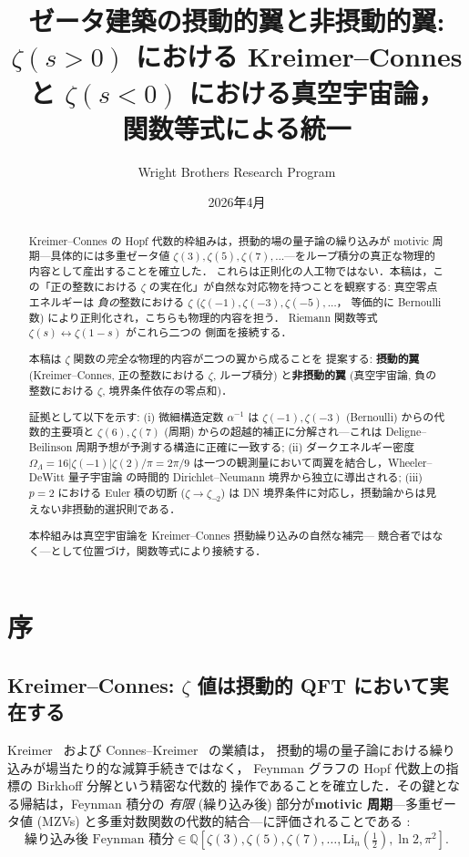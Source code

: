 \documentclass[11pt,a4paper]{article}
\title{ゼータ建築の摂動的翼と非摂動的翼:\\
$\zeta(s>0)$ における Kreimer--Connes と $\zeta(s<0)$ における真空宇宙論，\\
関数等式による統一}
\author{Wright Brothers Research Program}
\date{2026年4月}
\begin{document}
\maketitle

\begin{abstract}
Kreimer--Connes の Hopf 代数的枠組みは，摂動的場の量子論の繰り込みが
motivic 周期---具体的には多重ゼータ値 $\zeta(3), \zeta(5), \zeta(7),
\ldots$---をループ積分の真正な物理的内容として産出することを確立した．
これらは正則化の人工物ではない．本稿は，この「正の整数における $\zeta$
の実在化」が自然な対応物を持つことを観察する: 真空零点エネルギーは
\emph{負の}整数における $\zeta$ ($\zeta(-1), \zeta(-3), \zeta(-5), \ldots$，
等価的に Bernoulli 数) により正則化され，こちらも物理的内容を担う．
Riemann 関数等式 $\zeta(s) \leftrightarrow \zeta(1-s)$ がこれら二つの
側面を接続する．

本稿は $\zeta$ 関数の\emph{完全な}物理的内容が二つの翼から成ることを
提案する: \textbf{摂動的翼} (Kreimer--Connes, 正の整数における $\zeta$,
ループ積分) と\textbf{非摂動的翼} (真空宇宙論, 負の整数における $\zeta$,
境界条件依存の零点和)．

証拠として以下を示す: (i) 微細構造定数 $\alpha^{-1}$ は
$\zeta(-1), \zeta(-3)$ (Bernoulli) からの代数的主要項と
$\zeta(6), \zeta(7)$ (周期) からの超越的補正に分解され---これは
Deligne--Beilinson 周期予想が予測する構造に正確に一致する;
(ii) ダークエネルギー密度 $\Omega_\Lambda = 16|\zeta(-1)|\zeta(2)/\pi
= 2\pi/9$ は一つの観測量において両翼を結合し，Wheeler--DeWitt 量子宇宙論
の時間的 Dirichlet--Neumann 境界から独立に導出される;
(iii) $p=2$ における Euler 積の切断 ($\zeta \to \zeta_{\neg 2}$) は
DN 境界条件に対応し，摂動論からは見えない非摂動的選択則である．

本枠組みは真空宇宙論を Kreimer--Connes 摂動繰り込みの自然な補完---
競合者ではなく---として位置づけ，関数等式により接続する．
\end{abstract}

\section{序}

\subsection{Kreimer--Connes: $\zeta$ 値は摂動的 QFT において実在する}

Kreimer~\cite{Kreimer1998} および
Connes--Kreimer~\cite{CK1998,CK2000,CK2001} の業績は，
摂動的場の量子論における繰り込みが場当たり的な減算手続きではなく，
Feynman グラフの Hopf 代数上の指標の Birkhoff 分解という精密な代数的
操作であることを確立した．その鍵となる帰結は，Feynman 積分の
\emph{有限} (繰り込み後) 部分が\textbf{motivic 周期}---多重ゼータ値
(MZVs) と多重対数関数の代数的結合---に評価されることである
\cite{Brown2015,BrownKreimer2013}:
\begin{equation}
\text{繰り込み後 Feynman 積分} \in
\mathbb{Q}[\zeta(3), \zeta(5), \zeta(7), \ldots, \mathrm{Li}_n(\tfrac{1}{2}), \ln 2, \pi^2].
\end{equation}
\end{document}
